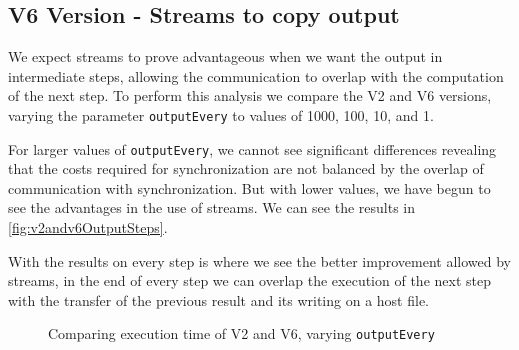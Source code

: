 \documentclass[conference]{IEEEtran}
\begin{document}
\subsection{V6 Version - Streams to copy output}


We expect streams to prove advantageous when we want the output in intermediate steps, allowing the communication to overlap with the computation of the next step. To perform this analysis we compare the V2 and V6 versions, varying the parameter \texttt{outputEvery} to values of 1000, 100, 10, and 1.

For larger values of \texttt{outputEvery}, we cannot see significant differences revealing that the costs required for synchronization are not balanced by the overlap of communication with synchronization. But with lower values, we have begun to see the advantages in the use of streams. We can see the results in \autoref{fig:v2andv6OutputSteps}.

With the results on every step is where we see the better improvement allowed by streams, in the end of every step we can overlap the execution of the next step with the transfer of the previous result and its writing on a host file.


\begin{figure}[ht]
  \centering
  \caption{Comparing execution time of V2 and V6, varying \texttt{outputEvery}}
  \label{fig:v2andv6OutputSteps}
\end{figure}
\end{document}
